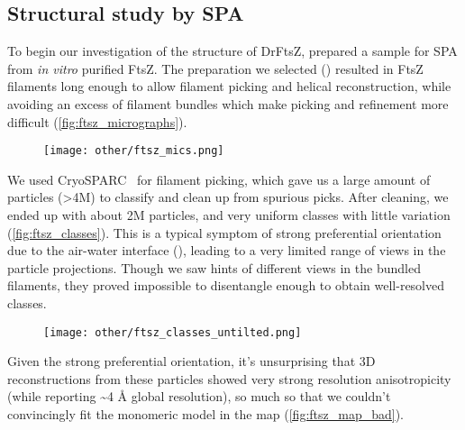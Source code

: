 \subsection{Structural study by SPA}

To begin our investigation of the structure of DrFtsZ, prepared a sample for SPA from \textit{in vitro} purified FtsZ.
The preparation we selected () resulted in FtsZ filaments long enough to allow filament picking and helical reconstruction, while avoiding an excess of filament bundles which make picking and refinement more difficult (\autoref{fig:ftsz_micrographs}).

\begin{figure}[ht]
    \centering
    \texttt{[image: other/ftsz\_mics.png]}
    \label{fig:ftsz_micrographs}
\end{figure}

We used CryoSPARC~\cite{punjaniCryoSPARCAlgorithmsRapid2017} for filament picking, which gave us a large amount of particles (>4M) to classify and clean up from spurious picks.
After cleaning, we ended up with about 2M particles, and very uniform classes with little variation (\autoref{fig:ftsz_classes}).
This is a typical symptom of strong preferential orientation due to the air-water interface (), leading to a very limited range of views in the particle projections.
Though we saw hints of different views in the bundled filaments, they proved impossible to disentangle enough to obtain well-resolved classes.

\begin{figure}[ht]
    \centering
    \texttt{[image: other/ftsz\_classes\_untilted.png]}
    \label{fig:ftsz_classes}
\end{figure}

Given the strong preferential orientation, it's unsurprising that 3D reconstructions from these particles showed very strong resolution anisotropicity (while reporting \sim4 Å global resolution), so much so that we couldn't convincingly fit the monomeric model in the map (\autoref{fig:ftsz_map_bad}).

